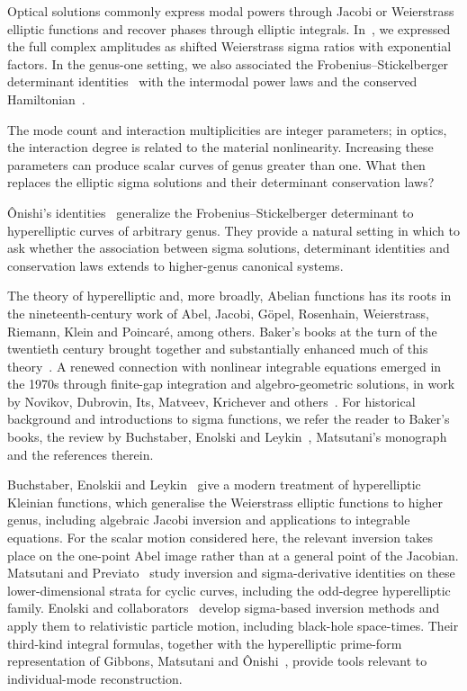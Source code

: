 \documentclass[11pt]{article}
\begin{document}
Optical solutions commonly express modal powers through Jacobi or Weierstrass elliptic functions and recover phases through elliptic integrals. In~\cite{envelopes,fourwave,coupler}, we expressed the full complex amplitudes as shifted Weierstrass sigma ratios with exponential factors. In the genus-one setting, we also associated the Frobenius--Stickelberger determinant identities~\cite{frobenius-stickelberger} with the intermodal power laws and the conserved Hamiltonian~\cite{fourwave,coupler}.

The mode count and interaction multiplicities are integer parameters; in optics, the interaction degree is related to the material nonlinearity. Increasing these parameters can produce scalar curves of genus greater than one. What then replaces the elliptic sigma solutions and their determinant conservation laws?

\^Onishi's identities~\cite{onishi} generalize the Frobenius--Stickelberger determinant to hyperelliptic curves of arbitrary genus. They provide a natural setting in which to ask whether the association between sigma solutions, determinant identities and conservation laws extends to higher-genus canonical systems.

The theory of hyperelliptic and, more broadly, Abelian functions has its roots in the nineteenth-century work of Abel, Jacobi, G\"opel, Rosenhain, Weierstrass, Riemann, Klein and Poincar\'e, among others. Baker's books at the turn of the twentieth century brought together and substantially enhanced much of this theory~\cite{baker-abelian,baker-periodic}. A renewed connection with nonlinear integrable equations emerged in the 1970s through finite-gap integration and algebro-geometric solutions, in work by Novikov, Dubrovin, Its, Matveev, Krichever and others~\cite{krichever,finite-gap}. For historical background and introductions to sigma functions, we refer the reader to Baker's books, the review by Buchstaber, Enolski and Leykin~\cite{bel-sigma}, Matsutani's monograph~\cite{matsutani-book} and the references therein.

Buchstaber, Enolskii and Leykin~\cite{bel-kleinian} give a modern treatment of hyperelliptic Kleinian functions, which generalise the Weierstrass elliptic functions to higher genus, including algebraic Jacobi inversion and applications to integrable equations. For the scalar motion considered here, the relevant inversion takes place on the one-point Abel image rather than at a general point of the Jacobian. Matsutani and Previato~\cite{mp-strata,mp-strata-ii} study inversion and sigma-derivative identities on these lower-dimensional strata for cyclic curves, including the odd-degree hyperelliptic family. Enolski and collaborators~\cite{enolski,thirdkind} develop sigma-based inversion methods and apply them to relativistic particle motion, including black-hole space-times. Their third-kind integral formulas, together with the hyperelliptic prime-form representation of Gibbons, Matsutani and \^Onishi~\cite{primeform}, provide tools relevant to individual-mode reconstruction.
\end{document}
